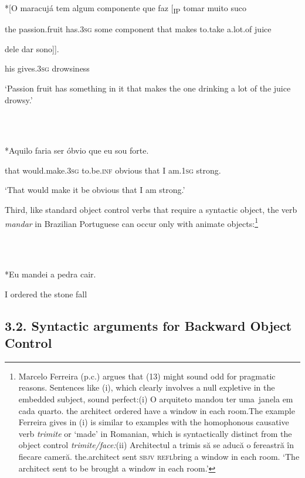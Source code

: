 \documentclass[output=paper]{langsci/langscibook}
\begin{document}
          *[O maracujá      tem       algum componente que faz     [\textsubscript{IP} tomar  muito   suco 

  the  passion.fruit has.3\textsc{sg} some  component   that makes    to.take a.lot.of juice 

dele dar            sono]].

   his   gives.3\textsc{sg} drowsiness

  ‘Passion fruit has something in it that makes the one drinking a lot of the juice     drowsy.’ \citep[119]{Farrell1995}

\ea%
    \label{ex:key:12}
    \gll\\
        \\
    \glt
    \z

          *Aquilo faria                ser           óbvio    que eu sou        forte.

  that        would.make.3\textsc{sg}   to.be.\textsc{inf} obvious that  I  am.\textsc{1sg} strong.

  ‘That would make it be obvious that I am strong.’ \citep[120]{Farrell1995}

Third, like standard object control verbs that require a syntactic object, the verb \textit{mandar} in Brazilian Portuguese can occur only with animate objects:\footnote{Marcelo Ferreira (p.c.) argues that (13) might sound odd for pragmatic reasons. Sentences like (i), which clearly involves a null expletive in the~ embedded subject, sound perfect:(i)  O   arquiteto mandou   ter    uma~janela    em cada quarto.  the architect  ordered   have a      window in  each  room.The example Ferreira gives in (i) is similar to examples with the homophonous causative verb \textit{trimite} or ‘made’ in Romanian, which is syntactically distinct from the object control \textit{trimite/face:}(ii)    Architectul   a trimis să     se    aducă o fereastră în fiecare cameră.  the.architect sent       \textsc{sbjv refl}bring a window   in each    room.  ‘The architect sent to be brought a window in each room.’}

\ea%
    \label{ex:key:13}
    \gll\\
        \\
    \glt
    \z

          *Eu  mandei  a   pedra cair.

    I      ordered the stone fall

\subsection{ 3.2. Syntactic arguments for Backward Object Control} 
\end{document}
